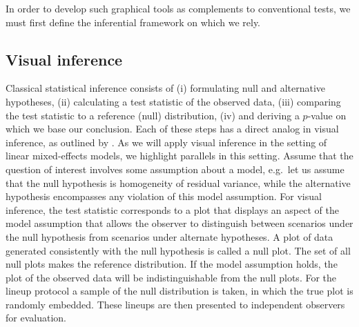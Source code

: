 \documentclass[12pt]{article} %
\newcommand{\al}[1]{{\color{ForestGreen} #1}}
\newcommand{\alnote}[1]{\todo[inline,color=green!40]{#1}} %
\newcommand{\hhnote}[1]{\todo[inline,color=orange!40]{#1}}
\begin{document}
In order to develop such graphical tools as complements to conventional tests, we must first define the inferential framework on which we rely.

\subsection{Visual inference}\label{sec:vi}

Classical statistical inference consists of 
(i) formulating  null and alternative hypotheses,
	(ii) calculating a test statistic of the observed data,
	(iii) comparing the test statistic to a reference (null) distribution,
	(iv) and deriving a $p$-value on which we base our conclusion.
Each of these steps has a direct analog in visual inference, as outlined by \cite{Buja:2009hp}. As we will apply visual inference in the setting of linear mixed-effects models, we highlight  parallels \al{in this setting}. Assume that  the question of interest involves  some assumption about a model, e.g.~let us assume that the null hypothesis is  homogeneity of residual variance,
while
the alternative hypothesis encompasses any violation of this model assumption. For visual inference, the test statistic corresponds to a plot  that displays an aspect of  the model assumption that allows the observer to distinguish between scenarios under the null hypothesis from scenarios under alternate hypotheses. 
A plot of data generated consistently with the null hypothesis is called a null plot. The set of all null plots makes the reference distribution. 
If the model assumption holds, the plot of the observed data will be indistinguishable from the null plots. 
For the lineup protocol a sample of the null distribution is taken, in which
the true plot is randomly embedded.  These lineups are then presented to independent observers for evaluation. 
\end{document}
